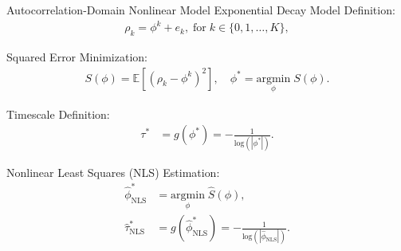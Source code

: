 \documentclass[8pt,aspectratio=169]{beamer}
\begin{document}
\begin{frame}{Autocorrelation-Domain Nonlinear Model}
\vfill
Exponential Decay Model Definition:
\begin{align}\label{eq:nlm}
    \rho_k = \phi^k + e_k, \; \text{for}\; k \in \{0, 1, \ldots, K\},
\end{align}

Squared Error Minimization:
\begin{align}\label{eq:nlm_loss}
    S(\phi) = \mathbb{E}[(\rho_k - \phi^k)^2], \quad \phi^* = \underset{\phi}{\text{argmin}} \; S(\phi).
\end{align}

Timescale Definition:
\begin{align}
    \tau^* &= g(\phi^*) = -\frac{1}{\text{log}(|\phi^*|)}. \label{eq:nlm-tau}
\end{align}

Nonlinear Least Squares (NLS) Estimation:
\begin{align}
    \hat \phi^*_{\scriptscriptstyle\text{NLS}} &= \underset{\phi}{\text{argmin}} \; \widehat{S}(\phi), \label{eq:nls_phi_}\\
    \hat \tau^*_{\scriptscriptstyle\text{NLS}} &= g(\hat \phi^*_{\scriptscriptstyle\text{NLS}}) = -\frac{1}{\text{log}(|\hat\phi_{\scriptscriptstyle\text{NLS}}|)}.
\end{align}

\end{frame}
\end{document}
